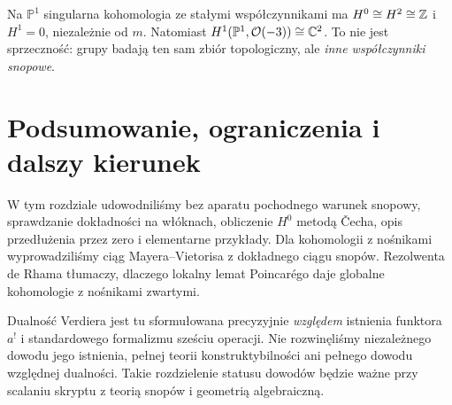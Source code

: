 \begin{uwaga}
Na $\mathbb P^1$ singularna kohomologia ze stałymi
współczynnikami ma $H^0\cong H^2\cong\mathbb{Z}$ i
$H^1=0$, niezależnie od $m$. Natomiast
$H^1(\mathbb P^1,\mathcal O(-3))\cong\mathbb{C}^2$.
To nie jest sprzeczność: grupy badają ten sam
zbiór topologiczny, ale \emph{inne współczynniki snopowe}.
\end{uwaga}


\section{Podsumowanie, ograniczenia i dalszy kierunek}
W tym rozdziale udowodniliśmy bez aparatu pochodnego
warunek snopowy, sprawdzanie dokładności na włóknach,
obliczenie $H^0$ metodą \v{C}echa, opis przedłużenia przez zero
i elementarne przykłady. Dla kohomologii z nośnikami
wyprowadziliśmy ciąg Mayera--Vietorisa z dokładnego
ciągu snopów. Rezolwenta de Rhama tłumaczy,
dlaczego lokalny lemat Poincarégo daje globalne
kohomologie z nośnikami zwartymi.

Dualność Verdiera jest tu sformułowana precyzyjnie
\emph{względem} istnienia funktora $a^!$
i standardowego formalizmu sześciu operacji.
Nie rozwinęliśmy niezależnego dowodu jego istnienia,
pełnej teorii konstruktybilności ani
pełnego dowodu względnej dualności. Takie rozdzielenie
statusu dowodów będzie ważne przy scalaniu skryptu
z teorią snopów i geometrią algebraiczną.


